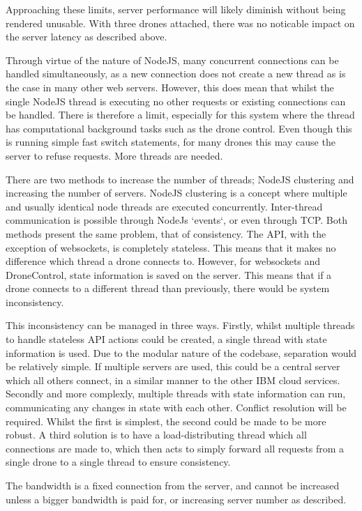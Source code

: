 \documentclass{article}
\begin{document}
Approaching these limits, server performance will likely diminish without being rendered unusable. With three drones attached, there was no noticable impact on the server latency as described above. 

Through virtue of the nature of NodeJS, many concurrent connections can be handled simultaneously, as a new connection does not create a new thread as is the case in many other web servers. However, this does mean that whilst the single NodeJS thread is executing no other requests or existing connections can be handled. There is therefore a limit, especially for this system where the thread has computational background tasks such as the drone control. Even though this is running simple fast switch statements, for many drones this may cause the server to refuse requests. More threads are needed.

There are two methods to increase the number of threads; NodeJS clustering and increasing the number of servers. NodeJS clustering is a concept where multiple and usually identical node threads are executed concurrently. Inter-thread communication is possible through NodeJs `events`, or even through TCP. Both methods present the same problem, that of consistency. The API, with the exception of websockets, is completely stateless. This means that it makes no difference which thread a drone connects to. However, for websockets and DroneControl, state information is saved on the server. This means that if a drone connects to a different thread than previously, there would be system inconsistency.

This inconsistency can be managed in three ways. Firstly, whilst multiple threads to handle stateless API actions could be created, a single thread with state information is used. Due to the modular nature of the codebase, separation would be relatively simple. If multiple servers are used, this could be a central server which all others connect, in a similar manner to the other IBM cloud services. Secondly and more complexly, multiple threads with state information can run, communicating any changes in state with each other. Conflict resolution will be required. Whilst the first is simplest, the second could be made to be more robust. A third solution is to have a load-distributing thread which all connections are made to, which then acts to simply forward all requests from a single drone to a single thread to ensure consistency. 

The bandwidth is a fixed connection from the server, and cannot be increased unless a bigger bandwidth is paid for, or increasing server number as described.
\end{document}
